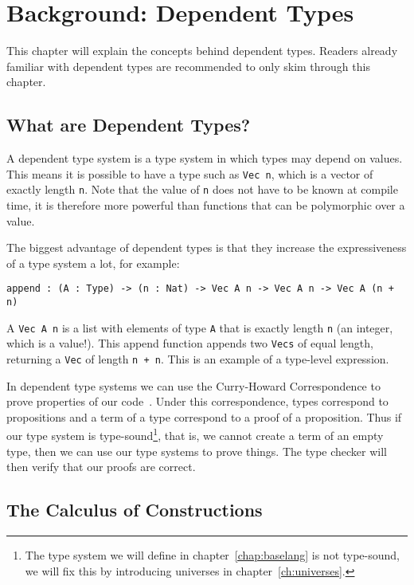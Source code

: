 \chapter{\label{chap:bg-dp}Background: Dependent Types}

This chapter will explain the concepts behind dependent types. Readers already familiar with dependent types are recommended to only skim through this chapter.

\section{What are Dependent Types?}

A dependent type system is a type system in which types may depend on values. This means it is possible to have a type such as \verb|Vec n|, which is a vector of exactly length \verb|n|. Note that the value of \verb|n| does not have to be known at compile time, it is therefore more powerful than functions that can be polymorphic over a value.

The biggest advantage of dependent types is that they increase the expressiveness of a type system a lot, for example:
\begin{lstlisting}
append : (A : Type) -> (n : Nat) -> Vec A n -> Vec A n -> Vec A (n + n)
\end{lstlisting}
A \verb|Vec A n| is a list with elements of type \verb|A| that is exactly length \verb|n| (an integer, which is a value!). This append function appends two \verb|Vecs| of equal length, returning a \verb|Vec| of length \verb|n + n|. This is an example of a type-level expression.

In dependent type systems we can use the Curry-Howard Correspondence to prove properties of our code~\cite{chc}. Under this correspondence, types correspond to propositions and a term of a type correspond to a proof of a proposition. Thus if our type system is type-sound\footnote{The type system we will define in chapter~\ref{chap:baselang} is not type-sound, we will fix this by introducing universes in chapter~\ref{ch:universes}.}, that is, we cannot create a term of an empty type, then we can use our type systems to prove things. The type checker will then verify that our proofs are correct.

\section{The Calculus of Constructions}


